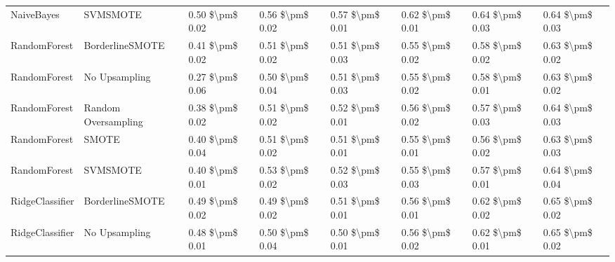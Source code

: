 \begin{tabular}{llllllll}
                     NaiveBayes &                      SVMSMOTE & 0.50 \$\textbackslash pm\$ 0.02 &           0.56 \$\textbackslash pm\$ 0.02 &       0.57 \$\textbackslash pm\$ 0.01 &        0.62 \$\textbackslash pm\$ 0.01 &                         0.64 \$\textbackslash pm\$ 0.03 &     0.64 \$\textbackslash pm\$ 0.03 \\
                   RandomForest &               BorderlineSMOTE & 0.41 \$\textbackslash pm\$ 0.02 &           0.51 \$\textbackslash pm\$ 0.02 &       0.51 \$\textbackslash pm\$ 0.03 &        0.55 \$\textbackslash pm\$ 0.02 &                         0.58 \$\textbackslash pm\$ 0.02 &     0.63 \$\textbackslash pm\$ 0.02 \\
                   RandomForest &                 No Upsampling & 0.27 \$\textbackslash pm\$ 0.06 &           0.50 \$\textbackslash pm\$ 0.04 &       0.51 \$\textbackslash pm\$ 0.03 &        0.55 \$\textbackslash pm\$ 0.02 &                         0.58 \$\textbackslash pm\$ 0.01 &     0.63 \$\textbackslash pm\$ 0.02 \\
                   RandomForest &           Random Oversampling & 0.38 \$\textbackslash pm\$ 0.02 &           0.51 \$\textbackslash pm\$ 0.02 &       0.52 \$\textbackslash pm\$ 0.01 &        0.56 \$\textbackslash pm\$ 0.02 &                         0.57 \$\textbackslash pm\$ 0.03 &     0.64 \$\textbackslash pm\$ 0.03 \\
                   RandomForest &                         SMOTE & 0.40 \$\textbackslash pm\$ 0.04 &           0.51 \$\textbackslash pm\$ 0.02 &       0.51 \$\textbackslash pm\$ 0.01 &        0.55 \$\textbackslash pm\$ 0.01 &                         0.56 \$\textbackslash pm\$ 0.02 &     0.63 \$\textbackslash pm\$ 0.03 \\
                   RandomForest &                      SVMSMOTE & 0.40 \$\textbackslash pm\$ 0.01 &           0.53 \$\textbackslash pm\$ 0.02 &       0.52 \$\textbackslash pm\$ 0.03 &        0.55 \$\textbackslash pm\$ 0.03 &                         0.57 \$\textbackslash pm\$ 0.01 &     0.64 \$\textbackslash pm\$ 0.04 \\
                RidgeClassifier &               BorderlineSMOTE & 0.49 \$\textbackslash pm\$ 0.02 &           0.49 \$\textbackslash pm\$ 0.02 &       0.51 \$\textbackslash pm\$ 0.01 &        0.56 \$\textbackslash pm\$ 0.01 &                         0.62 \$\textbackslash pm\$ 0.02 &     0.65 \$\textbackslash pm\$ 0.02 \\
                RidgeClassifier &                 No Upsampling & 0.48 \$\textbackslash pm\$ 0.01 &           0.50 \$\textbackslash pm\$ 0.04 &       0.50 \$\textbackslash pm\$ 0.01 &        0.56 \$\textbackslash pm\$ 0.02 &                         0.62 \$\textbackslash pm\$ 0.01 &     0.65 \$\textbackslash pm\$ 0.02 \\

\end{tabular}
